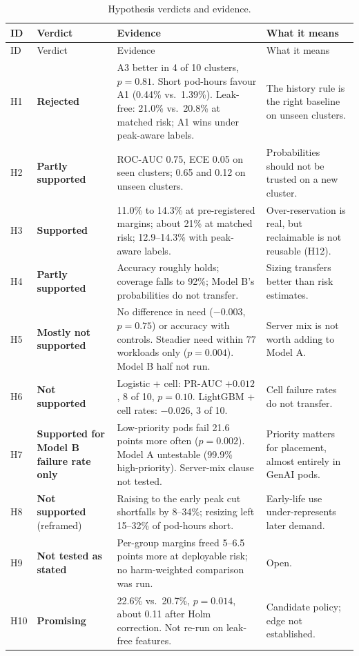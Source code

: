 \documentclass[10pt]{article}
\begin{document}
{\small
\begin{longtable}{@{}P{0.7cm}P{2.3cm}P{6.1cm}P{3.8cm}@{}}
\caption{Hypothesis verdicts and evidence.}\label{tab:verdicts}\\
\toprule
ID & Verdict & Evidence & What it means \\
\midrule
\endfirsthead
\toprule
ID & Verdict & Evidence & What it means \\
\midrule
\endhead
H1 & \textbf{Rejected} & A3 better in 4 of 10 clusters, $p = 0.81$. Short pod-hours favour A1 (0.44\% vs.\ 1.39\%). Leak-free: 21.0\% vs.\ 20.8\% at matched risk; A1 wins under peak-aware labels. & The history rule is the right baseline on unseen clusters. \\
H2 & \textbf{Partly supported} & ROC-AUC 0.75, ECE 0.05 on seen clusters; 0.65 and 0.12 on unseen clusters. & Probabilities should not be trusted on a new cluster. \\
H3 & \textbf{Supported} & 11.0\% to 14.3\% at pre-registered margins; about 21\% at matched risk; 12.9--14.3\% with peak-aware labels. & Over-reservation is real, but reclaimable is not reusable (H12). \\
H4 & \textbf{Partly supported} & Accuracy roughly holds; coverage falls to 92\%; Model B's probabilities do not transfer. & Sizing transfers better than risk estimates. \\
H5 & \textbf{Mostly not supported} & No difference in need ($-0.003$, $p = 0.75$) or accuracy with controls. Steadier need within 77 workloads only ($p = 0.004$). Model B half not run. & Server mix is not worth adding to Model A. \\
H6 & \textbf{Not supported} & Logistic + cell: PR-AUC $+0.012$, 8 of 10, $p = 0.10$. LightGBM + cell rates: $-0.026$, 3 of 10. & Cell failure rates do not transfer. \\
H7 & \textbf{Supported for Model B failure rate only} & Low-priority pods fail 21.6 points more often ($p = 0.002$). Model A untestable (99.9\% high-priority). Server-mix clause not tested. & Priority matters for placement, almost entirely in GenAI pods. \\
H8 & \textbf{Not supported} (reframed) & Raising to the early peak cut shortfalls by 8--34\%; resizing left 15--32\% of pod-hours short. & Early-life use under-represents later demand. \\
H9 & \textbf{Not tested as stated} & Per-group margins freed 5--6.5 points more at deployable risk; no harm-weighted comparison was run. & Open. \\
H10 & \textbf{Promising} & 22.6\% vs.\ 20.7\%, $p = 0.014$, about 0.11 after Holm correction. Not re-run on leak-free features. & Candidate policy; edge not established. \\

\end{longtable}}
\end{document}
